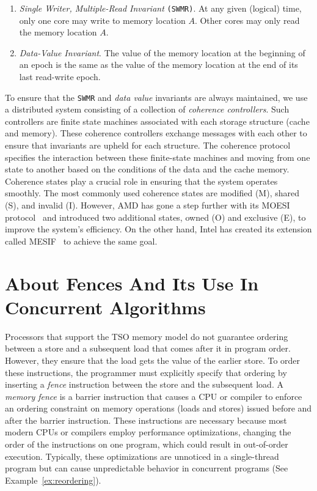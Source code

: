 \begin{enumerate}
  \item \emph{Single Writer, Multiple-Read Invariant} \texttt{(SWMR)}. At any given
 (logical) time, only one core may write to memory location \(A\). Other cores may only read the memory location \(A\).

  \item \emph{Data-Value Invariant}. The value of the memory location at the beginning of an epoch is the same as the value of the memory location at the end of its last read-write epoch.
\end{enumerate}

To ensure that the \texttt{SWMR} and \emph{data value} invariants are always maintained, we use a distributed system consisting of a collection of \emph{coherence controllers}. Such controllers are finite state machines associated with each storage structure (cache and memory). These coherence controllers exchange messages with each other to ensure that invariants are upheld for each structure. The coherence protocol specifies the interaction between these finite-state machines and moving from one state to another based on the conditions of the data and the cache memory.
Coherence states play a crucial role in ensuring that the system operates smoothly. The most commonly used coherence states are modified (M), shared (S), and invalid (I). However, AMD has gone a step further with its MOESI protocol~\cite{devices_amd64} and introduced two additional states, owned (O) and exclusive (E), to improve the system's efficiency. On the other hand, Intel has created its extension called MESIF~\cite{guideintel} to achieve the same goal.

\section{About Fences And Its Use In Concurrent Algorithms}

Processors that support the TSO memory model do not guarantee ordering between a store and a subsequent load that comes after it in program order. However, they ensure that the load gets the value of the earlier store.  To order these instructions, the programmer must explicitly specify that ordering by inserting a \emph{fence} instruction between the store and the subsequent load.
A \emph{memory fence} is a barrier instruction that causes a CPU or compiler to enforce an ordering constraint on memory operations (loads and stores) issued before and after the barrier instruction. These instructions are necessary because most modern CPUs or compilers employ performance optimizations, changing the order of the instructions on one program, which could result in out-of-order execution. Typically, these optimizations are unnoticed in a single-thread program but can cause unpredictable behavior in concurrent programs (See Example~\ref{ex:reordering}).

